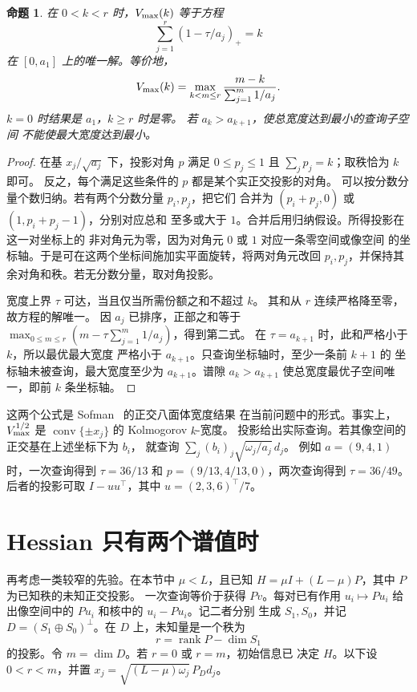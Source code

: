 \documentclass[UTF8,11pt,fontset=windows]{ctexart}
\newtheorem{proposition}[theorem]{命题}
\newcommand{\rank}{\operatorname{rank}}
\begin{document}
\begin{proposition}\label{prop:orthogonal}
在 \(0<k<r\) 时，\(V_{\rm max}(k)\) 等于方程
\[
 \sum_{j=1}^r (1-\tau/a_j)_+=k
\]
在 \([0,a_1]\) 上的唯一解。等价地，
\[
 V_{\rm max}(k)=
   \max_{k<m\le r}\frac{m-k}{\sum_{j=1}^m 1/a_j}.
\]
\(k=0\) 时结果是 \(a_1\)，\(k\ge r\) 时是零。
若 \(a_k>a_{k+1}\)，使总宽度达到最小的查询子空间
不能使最大宽度达到最小。
\end{proposition}

\begin{proof}
在基 \(x_j/\sqrt{a_j}\) 下，投影对角 \(p\) 满足
\(0\le p_j\le1\) 且 \(\sum_jp_j=k\)；取秩恰为 \(k\) 即可。
反之，每个满足这些条件的 \(p\) 都是某个实正交投影的对角。
可以按分数分量个数归纳。若有两个分数分量 \(p_i,p_j\)，把它们
合并为 \((p_i+p_j,0)\) 或 \((1,p_i+p_j-1)\)，分别对应总和
至多或大于 \(1\)。合并后用归纳假设。所得投影在这一对坐标上的
非对角元为零，因为对角元 \(0\) 或 \(1\) 对应一条零空间或像空间
的坐标轴。于是可在这两个坐标间施加实平面旋转，将两对角元改回
\(p_i,p_j\)，并保持其余对角和秩。若无分数分量，取对角投影。

宽度上界 \(\tau\) 可达，当且仅当所需份额之和不超过 \(k\)。
其和从 \(r\) 连续严格降至零，故方程的解唯一。
因 \(a_j\) 已排序，正部之和等于
\(\max_{0\le m\le r}(m-\tau\sum_{j=1}^m 1/a_j)\)，得到第二式。
在 \(\tau=a_{k+1}\) 时，此和严格小于 \(k\)，所以最优最大宽度
严格小于 \(a_{k+1}\)。只查询坐标轴时，至少一条前 \(k+1\) 的
坐标轴未被查询，最大宽度至少为 \(a_{k+1}\)。谱隙
\(a_k>a_{k+1}\) 使总宽度最优子空间唯一，即前 \(k\) 条坐标轴。
\end{proof}

这两个公式是 Sofman~\cite{Sofman} 的正交八面体宽度结果
在当前问题中的形式。事实上，\(V_{\rm max}^{1/2}\) 是
\(\operatorname{conv}\{\pm x_j\}\) 的 Kolmogorov \(k\)-宽度。
投影给出实际查询。若其像空间的正交基在上述坐标下为 \(b_i\)，
就查询 \(\sum_j (b_i)_j\sqrt{\omega_j/a_j}\,d_j\)。
例如 \(a=(9,4,1)\) 时，一次查询得到 \(\tau=36/13\) 和
\(p=(9/13,4/13,0)\)，两次查询得到 \(\tau=36/49\)。
后者的投影可取 \(I-uu^\top\)，其中 \(u=(2,3,6)^\top/7\)。

\section{Hessian 只有两个谱值时}

再考虑一类较窄的先验。在本节中 \(\mu<L\)，且已知
\(H=\mu I+(L-\mu)P\)，其中 \(P\) 为已知秩的未知正交投影。
一次查询等价于获得 \(Pv\)。每对已有作用 \(u_i\mapsto Pu_i\)
给出像空间中的 \(Pu_i\) 和核中的 \(u_i-Pu_i\)。记二者分别
生成 \(S_1,S_0\)，并记 \(D=(S_1\oplus S_0)^\perp\)。在 \(D\)
上，未知量是一个秩为
\[
 r=\rank P-\dim S_1
\]
的投影。令 \(m=\dim D\)。若 \(r=0\) 或 \(r=m\)，初始信息已
决定 \(H\)。以下设 \(0<r<m\)，并置
\(x_j=\sqrt{(L-\mu)\omega_j}\,P_Dd_j\)。
\end{document}
